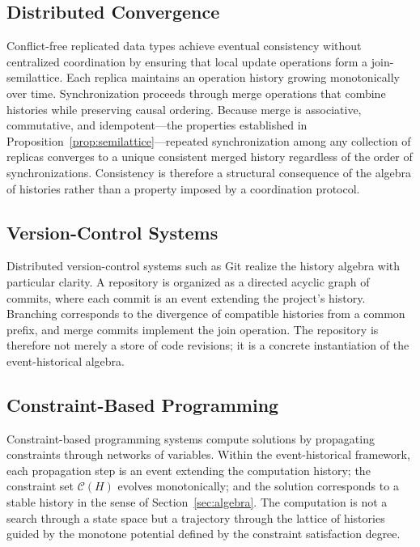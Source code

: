 \documentclass[12pt]{article}
\begin{document}
\subsection{Distributed Convergence}

Conflict-free replicated data types \cite{shapiro2011} achieve eventual consistency without
centralized coordination by ensuring that local update operations form a join-semilattice.
Each replica maintains an operation history growing monotonically over time. Synchronization
proceeds through merge operations that combine histories while preserving causal ordering.
Because merge is associative, commutative, and idempotent---the properties established in
Proposition~\ref{prop:semilattice}---repeated synchronization among any collection of replicas
converges to a unique consistent merged history regardless of the order of synchronizations.
Consistency is therefore a structural consequence of the algebra of histories rather than a
property imposed by a coordination protocol.

\subsection{Version-Control Systems}

Distributed version-control systems such as Git \cite{chacon2014} realize the history algebra
with particular clarity. A repository is organized as a directed acyclic graph of commits,
where each commit is an event extending the project's history. Branching corresponds to the
divergence of compatible histories from a common prefix, and merge commits implement the join
operation. The repository is therefore not merely a store of code revisions; it is a concrete
instantiation of the event-historical algebra.

\subsection{Constraint-Based Programming}

Constraint-based programming systems compute solutions by propagating constraints through
networks of variables. Within the event-historical framework, each propagation step is an
event extending the computation history; the constraint set $\mathcal{C}(H)$ evolves
monotonically; and the solution corresponds to a stable history in the sense of
Section~\ref{sec:algebra}. The computation is not a search through a state space but a
trajectory through the lattice of histories guided by the monotone potential defined by the
constraint satisfaction degree.
\end{document}
